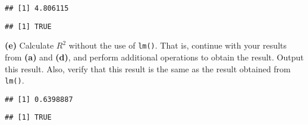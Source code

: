 \documentclass[
]{article}
\newenvironment{Shaded}{\begin{snugshade}}{\end{snugshade}}
\newcommand{\DataTypeTok}[1]{\textcolor[rgb]{0.13,0.29,0.53}{#1}}
\newcommand{\DecValTok}[1]{\textcolor[rgb]{0.00,0.00,0.81}{#1}}
\newcommand{\KeywordTok}[1]{\textcolor[rgb]{0.13,0.29,0.53}{\textbf{#1}}}
\newcommand{\NormalTok}[1]{#1}
\newcommand{\OperatorTok}[1]{\textcolor[rgb]{0.81,0.36,0.00}{\textbf{#1}}}
\newcommand{\StringTok}[1]{\textcolor[rgb]{0.31,0.60,0.02}{#1}}
\begin{document}
\begin{verbatim}
## [1] 4.806115
\end{verbatim}

\begin{Shaded}
\end{Shaded}

\begin{verbatim}
## [1] TRUE
\end{verbatim}

\textbf{(e)} Calculate \(R^2\) without the use of \texttt{lm()}. That
is, continue with your results from \textbf{(a)} and \textbf{(d)}, and
perform additional operations to obtain the result. Output this result.
Also, verify that this result is the same as the result obtained from
\texttt{lm()}.

\begin{Shaded}
\end{Shaded}

\begin{verbatim}
## [1] 0.6398887
\end{verbatim}

\begin{Shaded}
\end{Shaded}

\begin{verbatim}
## [1] TRUE
\end{verbatim}
\end{document}
